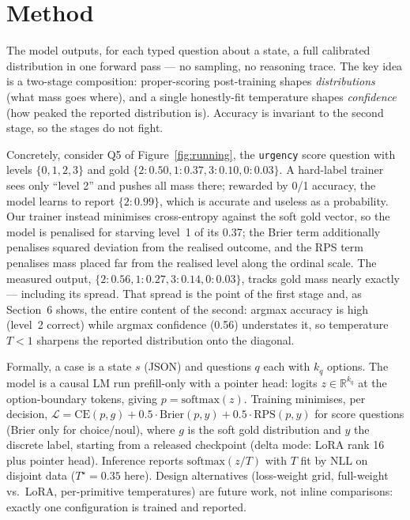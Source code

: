 \section{Method}

The model outputs, for each typed question about a state, a full calibrated
distribution in one forward pass — no sampling, no reasoning trace. The key
idea is a two-stage composition: proper-scoring post-training shapes
\emph{distributions} (what mass goes where), and a single honestly-fit
temperature shapes \emph{confidence} (how peaked the reported distribution
is). Accuracy is invariant to the second stage, so the stages do not fight.

Concretely, consider Q5 of Figure~\ref{fig:running}, the \texttt{urgency}
score question with levels $\{0,1,2,3\}$ and gold
$\{2{:}0.50, 1{:}0.37, 3{:}0.10, 0{:}0.03\}$. A hard-label trainer sees only
``level 2'' and pushes all mass there; rewarded by 0/1 accuracy, the model
learns to report $\{2{:}0.99\}$, which is accurate and useless as a
probability. Our trainer instead minimises cross-entropy against the soft
gold vector, so the model is penalised for starving level~1 of its 0.37; the
Brier term additionally penalises squared deviation from the realised
outcome, and the RPS term penalises mass placed far from the realised level
along the ordinal scale. The measured output,
$\{2{:}0.56, 1{:}0.27, 3{:}0.14, 0{:}0.03\}$, tracks gold mass nearly
exactly — including its spread. That spread is the point of the first stage
and, as Section~6 shows, the entire content of the second: argmax accuracy
is high (level~2 correct) while argmax confidence (0.56) understates it, so
temperature $T<1$ sharpens the reported distribution onto the diagonal.

Formally, a case is a state $s$ (JSON) and questions $q$ each with $k_q$
options. The model is a causal LM run prefill-only with a pointer head:
logits $z \in \mathbb{R}^{k_q}$ at the option-boundary tokens, giving
$p = \mathrm{softmax}(z)$. Training minimises, per decision,
$\mathcal{L} = \mathrm{CE}(p, g) + 0.5\cdot\mathrm{Brier}(p, y) +
0.5\cdot\mathrm{RPS}(p, y)$ for score questions (Brier only for
choice/noul), where $g$ is the soft gold distribution and $y$ the discrete
label, starting from a released checkpoint (delta mode: LoRA rank 16 plus
pointer head). Inference reports $\mathrm{softmax}(z/T)$ with $T$ fit by NLL
on disjoint data ($T^\star = 0.35$ here). Design alternatives (loss-weight
grid, full-weight vs.\ LoRA, per-primitive temperatures) are future work,
not inline comparisons: exactly one configuration is trained and reported.

